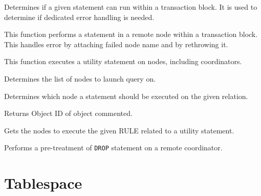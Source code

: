   Determines if a given statement can run within a transaction block.
  It is used to determine if dedicated error handling is needed.




  This function performs a statement in a remote node within a transaction block.
  This handles error by attaching failed node name and by rethrowing it.




  This function executes a utility statement on nodes, including coordinators.




  Determines the list of nodes to launch query on.




  Determines which node a statement should be executed on the given relation.




  Returns Object ID of object commented.




  Gets the nodes to execute the given RULE related to a utility statement.




  Performs a pre-treatment of \texttt{DROP} statement on a remote coordinator.



\section{\label{sec:tablespace}Tablespace}

